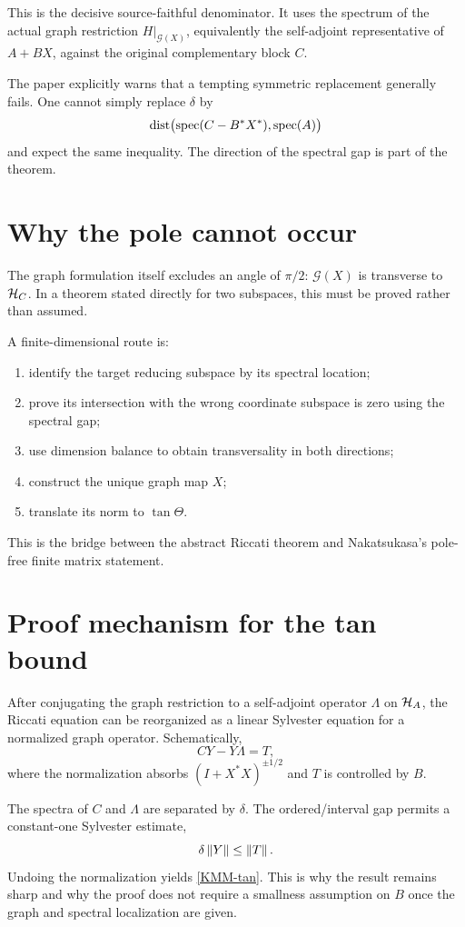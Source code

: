 This is the decisive source-faithful denominator. It uses the spectrum of the actual graph restriction $H|_{\mathcal G(X)}$, equivalently the self-adjoint representative of $A+BX$, against the original complementary block $C$.

The paper explicitly warns that a tempting symmetric replacement generally fails. One cannot simply replace $\delta$ by
\[
 \operatorname{dist}\bigl(\operatorname{spec}(C-B^*X^*),\operatorname{spec}(A)\bigr)
\]
and expect the same inequality. The direction of the spectral gap is part of the theorem.

\section{Why the pole cannot occur}

The graph formulation itself excludes an angle of $\pi/2$: $\mathcal G(X)$ is transverse to $\mathcal{H}_C$. In a theorem stated directly for two subspaces, this must be proved rather than assumed.

A finite-dimensional route is:
\begin{enumerate}[leftmargin=2em]
\item identify the target reducing subspace by its spectral location;
\item prove its intersection with the wrong coordinate subspace is zero using the spectral gap;
\item use dimension balance to obtain transversality in both directions;
\item construct the unique graph map $X$;
\item translate its norm to $\tan\Theta$.
\end{enumerate}
This is the bridge between the abstract Riccati theorem and Nakatsukasa's pole-free finite matrix statement.

\section{Proof mechanism for the tan bound}

After conjugating the graph restriction to a self-adjoint operator $\Lambda$ on $\mathcal{H}_A$, the Riccati equation can be reorganized as a linear Sylvester equation for a normalized graph operator. Schematically,
\[
 C Y-Y\Lambda=T,
\]
where the normalization absorbs $(I+X^*X)^{\pm1/2}$ and $T$ is controlled by $B$.

The spectra of $C$ and $\Lambda$ are separated by $\delta$. The ordered/interval gap permits a constant-one Sylvester estimate,
\[
 \delta\left\lVert Y\right\rVert\le\left\lVert T\right\rVert.
\]
Undoing the normalization yields \eqref{KMM-tan}. This is why the result remains sharp and why the proof does not require a smallness assumption on $B$ once the graph and spectral localization are given.

